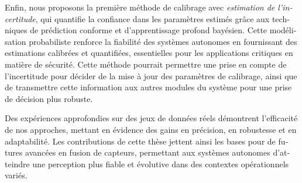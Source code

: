 \begin{otherlanguage}{french}
  Enfin, nous proposons la première méthode de calibrage avec \textit{estimation
    de l’incertitude}, qui quantifie la confiance dans les paramètres estimés grâce
  aux techniques de prédiction conforme et d’apprentissage profond bayésien.
  Cette modélisation probabiliste renforce la fiabilité des systèmes autonomes en
  fournissant des estimations calibrées et quantifiées, essentielles pour les
  applications critiques en matière de sécurité. Cette méthode pourrait permettre
  une prise en compte de l'incertitude pour décider de la mise à jour des
  paramètres de calibrage, ainsi que de transmettre cette information aux autres
  modules du système pour une prise de décision plus robuste.

  Des expériences approfondies sur des jeux de données réels démontrent
  l'efficacité de nos approches, mettant en évidence des gains en précision, en
  robustesse et en adaptabilité. Les contributions de cette thèse jettent ainsi
  les bases pour de futures avancées en fusion de capteurs, permettant aux
  systèmes autonomes d’atteindre une perception plus fiable et évolutive dans des
  contextes opérationnels variés.

\end{otherlanguage}

\endgroup

\vfill